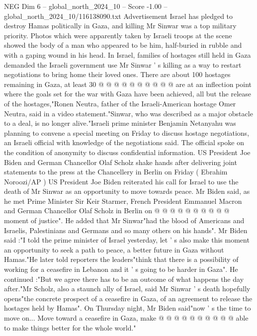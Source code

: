 \begin{textsample}{NEG Dim 6 – global\_north\_2024\_10 – Score -1.00 – global\_north\_2024\_10/116138090.txt}
Advertisement Israel has pledged to destroy Hamas politically in Gaza, and killing Mr Sinwar was a top military priority.
Photos which were apparently taken by Israeli troops at the scene showed the body of a man who appeared to be him, half-buried in rubble and with a gaping wound in his head.
In Israel, families of hostages still held in Gaza demanded the Israeli government use Mr Sinwar ' s killing as a way to restart negotiations to bring home their loved ones.
There are about 100 hostages remaining in Gaza, at least 30 @ @ @ @ @ @ @ @ @ @ are at an inflection point where the goals set for the war with Gaza have been achieved, all but the release of the hostages,"Ronen Neutra, father of the Israeli-American hostage Omer Neutra, said in a video statement."Sinwar, who was described as a major obstacle to a deal, is no longer alive."Israeli prime minister Benjamin Netanyahu was planning to convene a special meeting on Friday to discuss hostage negotiations, an Israeli official with knowledge of the negotiations said.
The official spoke on the condition of anonymity to discuss confidential information.
US President Joe Biden and German Chancellor Olaf Scholz shake hands after delivering joint statements to the press at the Chancellery in Berlin on Friday ( Ebrahim Noroozi/AP ) US President Joe Biden reiterated his call for Israel to use the death of Mr Sinwar as an opportunity to move towards peace.
Mr Biden said, as he met Prime Minister Sir Keir Starmer, French President Emmanuel Macron and German Chancellor Olaf Scholz in Berlin on @ @ @ @ @ @ @ @ @ @ moment of justice".
He added that Mr Sinwar"had the blood of Americans and Israelis, Palestinians and Germans and so many others on his hands".
Mr Biden said :"I told the prime minister of Israel yesterday, let ' s also make this moment an opportunity to seek a path to peace, a better future in Gaza without Hamas."He later told reporters the leaders"think that there is a possibility of working for a ceasefire in Lebanon and it ' s going to be harder in Gaza".
He continued :"But we agree there has to be an outcome of what happens the day after."Mr Scholz, also a staunch ally of Israel, said Mr Sinwar ' s death hopefully opens"the concrete prospect of a ceasefire in Gaza, of an agreement to release the hostages held by Hamas".
On Thursday night, Mr Biden said"now ' s the time to move on...
Move toward a ceasefire in Gaza, make @ @ @ @ @ @ @ @ @ @ able to make things better for the whole world."

\end{textsample}
